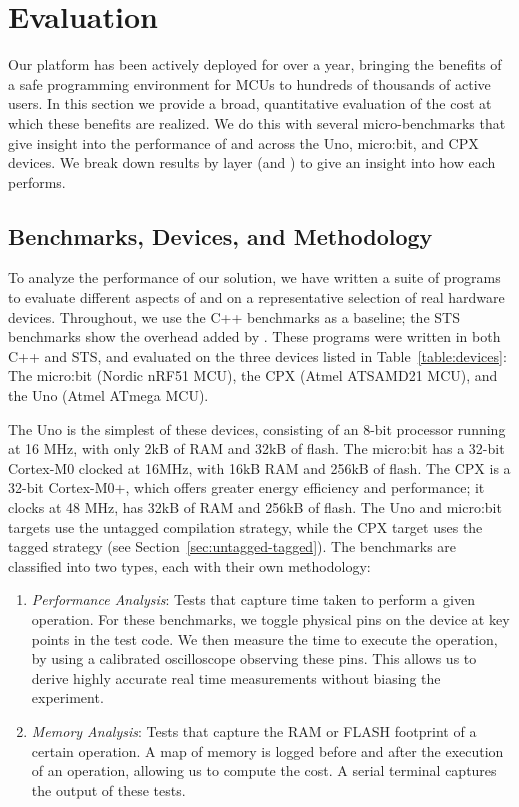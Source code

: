 \section{Evaluation}
\label{sec:evaluate}

Our platform has been actively deployed for over a year, bringing the benefits of a safe programming environment for MCUs to hundreds of thousands of active users. In this section we provide a broad, quantitative evaluation of the cost at which these benefits are realized. We do this with several micro-benchmarks that give insight into the performance of \MC and \CO across the Uno, micro:bit, and CPX devices. We break down results by layer (\CO and \MCN) to give an insight into how each performs.

\subsection{Benchmarks, Devices, and Methodology}

To analyze the performance of our solution, we have written a suite of programs to evaluate different aspects of \MC and \CO  on a representative selection of real hardware devices. Throughout, we use the C++ \CO benchmarks as a baseline; the STS benchmarks show the overhead added by \MCN. These programs were written in both C++ and STS, and evaluated on the three devices listed in Table~\ref{table:devices}: The micro:bit (Nordic nRF51 MCU), the CPX (Atmel ATSAMD21 MCU), and the Uno (Atmel ATmega MCU).

The Uno is the simplest of these devices,
consisting of an 8-bit processor running at 16 MHz, with only 2kB of RAM and 32kB of flash.
The micro:bit has a 32-bit Cortex-M0 clocked at 16MHz, with 16kB RAM and 256kB of flash. The CPX is a 32-bit Cortex-M0+, which offers greater energy efficiency and performance; it clocks at 48 MHz, has 32kB of RAM and 256kB of flash. The Uno and micro:bit \MC targets use the untagged compilation strategy, while the CPX target uses the tagged strategy (see Section~\ref{sec:untagged-tagged}). The benchmarks are classified into two types, each with their own methodology:

\begin{enumerate}
    \item \textit{Performance Analysis}: Tests that capture time taken to perform a given operation. For these benchmarks, we toggle physical pins on the device at key points in
    the test code. We then measure the time to
   execute the operation, by using a calibrated oscilloscope observing these pins. This allows us to derive highly accurate real time
   measurements without biasing the experiment.

    \item \textit{Memory Analysis}: Tests that capture the RAM or FLASH footprint of a certain operation. A map of memory is logged before and after the execution of an operation, allowing us to compute the cost.
    A serial terminal captures the output of these tests.
\end{enumerate}

